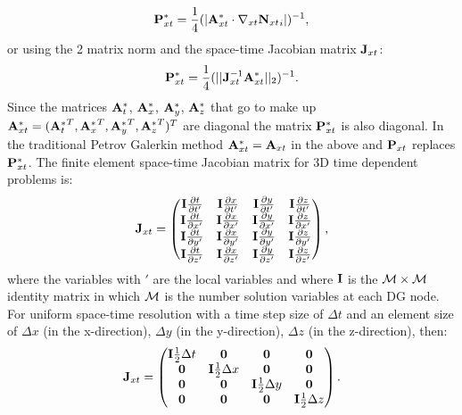 \begin{equation}
 {\bf P}^*_{xt} = \frac{1}{4} (\vert {\bf A}_{xt}^* \cdot {\nabla_{xt}} {{\bf N}_{xt}}_i \vert )^{-1}, 
\label{P*-matrix} 
\end{equation} 
or using the 2 matrix norm and the space-time Jacobian matrix ${\bf J}_{xt}$: 
\begin{equation}
 {\bf P}^*_{xt} = \frac{1}{4} (\vert\vert {\bf J}_{xt}^{-1} {\bf A}_{xt}^* \vert\vert_2 )^{-1} .  
\label{p*-matrix-j} 
\end{equation}       
Since the matrices ${\bf A}^*_t$,  ${\bf A}^*_x$,    ${\bf A}^*_y$,    ${\bf A}^*_z$ 
that go to make up ${\bf A}_{xt}^* = ({{\bf A}^*_t}^T,  {{\bf A}^*_x}^T,    {{\bf A}^*_y}^T,    {{\bf A}^*_z}^T )^T$  
are diagonal the matrix ${\bf P}^*_{xt}$ is also diagonal. 
In the traditional Petrov Galerkin method ${\bf A}_{xt}^*={\bf A}_{xt}$ in the 
 above and ${\bf P}_{xt}$ replaces ${\bf P}_{xt}^*$. 
 The finite element space-time Jacobian matrix for 3D time dependent problems 
 is: 
\begin{equation}
 {\bf J}_{xt} =
  \begin{pmatrix}
 {\bf I} \frac{\partial t}{\partial t^\prime} &
 {\bf I} \frac{\partial x}{\partial t^\prime} &
 {\bf I} \frac{\partial y}{\partial t^\prime} &
 {\bf I} \frac{\partial z}{\partial t^\prime} \\
 {\bf I} \frac{\partial t}{\partial x^\prime} &
 {\bf I} \frac{\partial x}{\partial x^\prime} &
 {\bf I} \frac{\partial y}{\partial x^\prime} &
 {\bf I} \frac{\partial z}{\partial x^\prime} \\
 {\bf I} \frac{\partial t}{\partial y^\prime} &
 {\bf I} \frac{\partial x}{\partial y^\prime} &
 {\bf I} \frac{\partial y}{\partial y^\prime} &
 {\bf I} \frac{\partial z}{\partial y^\prime} \\
 {\bf I} \frac{\partial t}{\partial z^\prime} &
 {\bf I} \frac{\partial x}{\partial z^\prime} &
 {\bf I} \frac{\partial y}{\partial z^\prime} &
 {\bf I} \frac{\partial z}{\partial z^\prime} 
  \end{pmatrix},
\label{J-matrix} 
\end{equation}
 where the variables with $\prime$ are the local variables and 
 where ${\bf I}$ is the ${\cal M}\times {\cal M}$ identity matrix 
 in which ${\cal M}$ is the number solution variables at each DG node. 
 For uniform space-time resolution with a time step size of $\Delta t$ 
 and an element size of 
 $\Delta x$ (in the x-direction), 
 $\Delta y$ (in the y-direction),
 $\Delta z$ (in the z-direction), then: 
\begin{equation}
 {\bf J}_{xt} =
  \begin{pmatrix}
 {\bf I} \frac{1}{2}\Delta t &
 {\bf 0}  &
 {\bf 0}  &
 {\bf 0}  \\
 {\bf 0}  &
 {\bf I} \frac{1}{2}\Delta x &
 {\bf 0}  &
 {\bf 0}  \\
 {\bf 0}  &
 {\bf 0}  &
 {\bf I} \frac{1}{2}\Delta y &
 {\bf 0} \\
 {\bf 0}  &
 {\bf 0}  &
 {\bf 0}  &
 {\bf I} \frac{1}{2}\Delta z 
  \end{pmatrix}.
\label{J-matrix-uniform} 
\end{equation}
